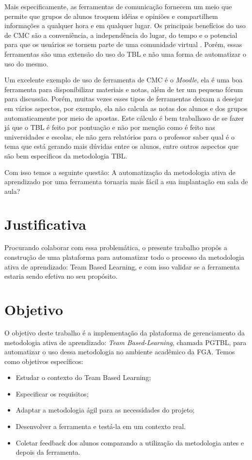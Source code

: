 Mais especificamente, as ferramentas de comunicação fornecem um meio que permite que grupos de alunos troquem idéias e opiniões e compartilhem informações a qualquer hora e em qualquer lugar. Os principais benefícios do uso de CMC são a conveniência, a independência do lugar, do tempo e o potencial para que os usuários se tornem parte de uma comunidade virtual \cite{berge}. Porém, essas ferramentas são uma extensão do uso do TBL e não uma forma de automatizar o uso do mesmo.

Um excelente exemplo de uso de ferramenta de CMC é o \textit{Moodle}, ela é uma boa ferramenta para disponibilizar materiais e notas, além de ter um pequeno fórum para discussão. Porém, muitas vezes esses tipos de ferramentas deixam a desejar em vários aspectos, por exemplo, ela não calcula as notas dos alunos e dos grupos automaticamente por meio de apostas. Este cálculo é bem trabalhoso de se fazer já que o TBL é feito por pontuação e não por menção como é feito nas universidades e escolas, ele não gera relatórios para o professor saber qual é o tema que está gerando mais dúvidas entre os alunos, entre outros aspectos que são bem especificos da metodologia TBL.

Com isso temos a seguinte questão: A automatização da metodologia ativa de aprendizado por uma ferramenta tornaria mais fácil a sua implantação em sala de aula?

\section{Justificativa}

Procurando colaborar com essa problemática, o presente trabalho propôs a construção de uma plataforma para automatizar todo o processo da metodologia ativa de aprendizado: Team Based Learning, e com isso validar se a ferramenta estaria sendo efetiva no seu propósito.

\section{Objetivo}

O objetivo deste trabalho é a implementação da plataforma de gerenciamento da metodologia ativa de aprendizado: \textit{Team Based-Learning}, chamada PGTBL, para automatizar o uso dessa metodologia no ambiente acadêmico da FGA. Temos como objetivos específicos:

\begin{itemize}
  \item Estudar o contexto do Team Based Learning;
  \item Especificar os requisitos;
  \item Adaptar a metodologia ágil para as necessidades do projeto;
  \item Desenvolver a ferramenta e testá-la em um contexto real.
  \item Coletar feedback dos alunos comparando a utilização da metodologia antes e depois da ferramenta.
\end{itemize}

